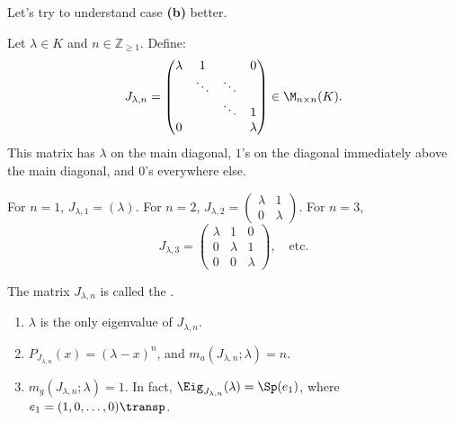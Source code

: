 Let's try to understand case \textbf{(b)} better.

\begin{definition}
\label{def:jordan_matrix}
Let $\lambda \in K$ and $n \in \mathbb{Z}_{\ge 1}$. Define:
\[
J_{\lambda, n} = \begin{pmatrix} \lambda & 1 & & 0 \\ & \ddots & \ddots & \\ & & \ddots & 1 \\ 0 & & & \lambda \end{pmatrix} \in \M_{n \times n}(K).
\]
This matrix has $\lambda$ on the main diagonal, $1$'s on the diagonal immediately above the main diagonal, and $0$'s everywhere else.

For $n=1$, $J_{\lambda, 1} = (\lambda)$. For $n=2$, $J_{\lambda, 2} = \left(\begin{smallmatrix} \lambda & 1 \\ 0 & \lambda \end{smallmatrix}\right)$. For $n=3$,
\[
J_{\lambda, 3} = \begin{pmatrix} \lambda & 1 & 0 \\ 0 & \lambda & 1 \\ 0 & 0 & \lambda \end{pmatrix}, \quad \text{etc.}
\]

The matrix $J_{\lambda, n}$ is called the .
\end{definition}

\begin{lemma}
\label{lem:properties_jordan_matrix}
\leavevmode
\begin{enumerate}[label=\textbf{(\alph*)}]
    \item $\lambda$ is the only eigenvalue of $J_{\lambda, n}$.
    \item $P_{J_{\lambda, n}}(x) = (\lambda - x)^n$, and $m_a(J_{\lambda, n}; \lambda) = n$.
    \item $m_g(J_{\lambda, n}; \lambda) = 1$. In fact, $\Eig_{J_{\lambda, n}}(\lambda) = \Sp(e_1)$, where $e_1 = (1, 0, \dots, 0)\transp$.
\end{enumerate}
\end{lemma}

